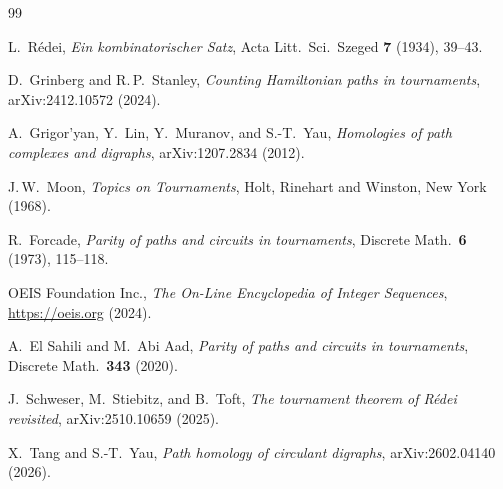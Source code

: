 \documentclass[12pt,reqno]{amsart}
\theoremstyle{plain}
\theoremstyle{definition}
\theoremstyle{remark}
\begin{document}
\begin{thebibliography}{99}

L.~R\'edei,
\emph{Ein kombinatorischer Satz},
Acta Litt.\ Sci.\ Szeged \textbf{7} (1934), 39--43.

D.~Grinberg and R.\,P.~Stanley,
\emph{Counting Hamiltonian paths in tournaments},
arXiv:2412.10572 (2024).

A.~Grigor'yan, Y.~Lin, Y.~Muranov, and S.-T.~Yau,
\emph{Homologies of path complexes and digraphs},
arXiv:1207.2834 (2012).

J.\,W.~Moon,
\emph{Topics on Tournaments},
Holt, Rinehart and Winston, New York (1968).

R.~Forcade,
\emph{Parity of paths and circuits in tournaments},
Discrete Math.\ \textbf{6} (1973), 115--118.

OEIS Foundation Inc.,
\emph{The On-Line Encyclopedia of Integer Sequences},
\url{https://oeis.org} (2024).

A.~El Sahili and M.~Abi Aad,
\emph{Parity of paths and circuits in tournaments},
Discrete Math.\ \textbf{343} (2020).

J.~Schweser, M.~Stiebitz, and B.~Toft,
\emph{The tournament theorem of R\'edei revisited},
arXiv:2510.10659 (2025).

X.~Tang and S.-T.~Yau,
\emph{Path homology of circulant digraphs},
arXiv:2602.04140 (2026).

\end{thebibliography}
\end{document}
